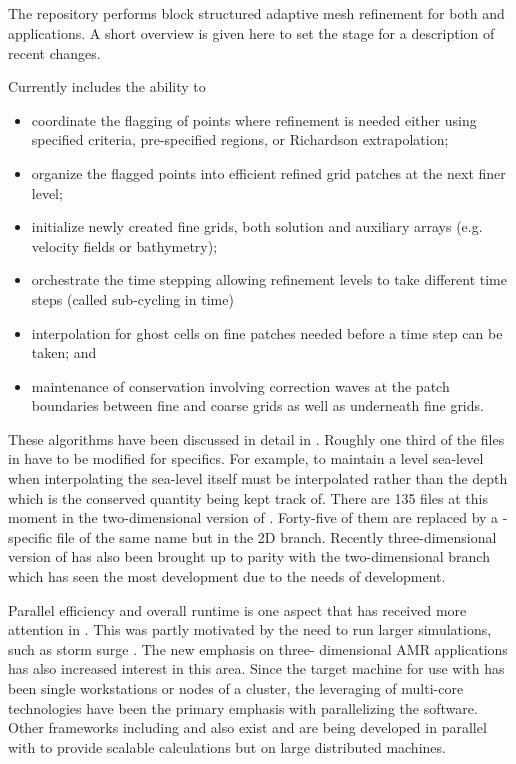%
%
%

\subsection{\amrclaw}
The \amrclaw repository performs block structured adaptive mesh
refinement \cite{Berger:1984ui,Berger:1989gg} for both 
\clawpack and \geoclaw  applications.
A short overview is given
here to set the stage for a description of recent changes.

Currently \amrclaw includes the ability to
\begin{itemize}
\item
coordinate the flagging of points where refinement is needed
either using specified criteria, pre-specified regions, or Richardson extrapolation;
\item
organize the flagged points into efficient refined grid
patches at the next finer level;
\item
initialize newly created fine grids, both solution and
auxiliary arrays (e.g. velocity fields or bathymetry);
\item
orchestrate the time stepping allowing refinement levels to take
different time steps (called sub-cycling in time)
\item
interpolation for ghost cells on fine patches needed before a time step can be taken; and
\item
maintenance of conservation involving correction waves at
the patch boundaries between fine and coarse grids as well as
underneath fine grids.
\end{itemize}

These algorithms have been discussed in detail in
\cite{Berger:1998ia,Berger:2011du}. Roughly one third of the files in \amrclaw
have to be modified for \geoclaw specifics. For example, to maintain a level
sea-level when interpolating the sea-level itself must be interpolated rather than the depth which is the conserved quantity being kept track of.  There are 135 files at this moment 
in the two-dimensional version of \amrclaw.
Forty-five of them are replaced by a \geoclaw-specific file of the
same name but in the \geoclaw 2D branch. Recently three-dimensional version of  \amrclaw has also been brought up to parity with the two-dimensional branch which has seen the most development due to the needs of \geoclaw development.

Parallel efficiency and overall runtime is one aspect that has received more
attention in . This was partly motivated by the need to run larger
simulations, such as storm surge \cite{Mandli:ws}.  The new emphasis on three-
dimensional AMR applications has also increased interest in this area.  Since
the target machine for use with \clawpack has been single workstations or nodes
of a cluster, the leveraging of multi-core technologies have been the primary
emphasis with parallelizing the software.  Other frameworks including
\forestclaw \cite{Burstedde:we} and \boxlib {} also
exist and are being developed in parallel with \amrclaw to provide scalable
calculations but on large distributed machines.

